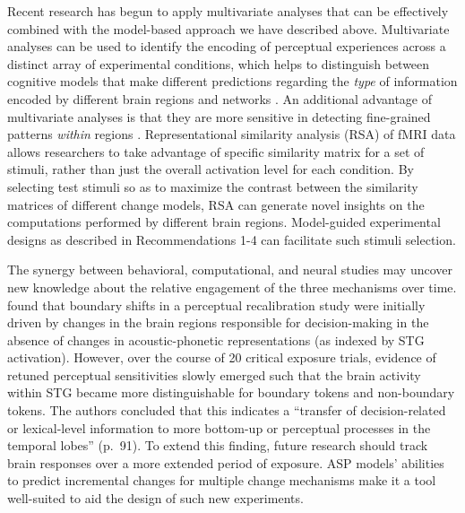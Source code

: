 \documentclass[
  11pt,
  man,floatsintext]{apa6}
\begin{document}
Recent research has begun to apply multivariate analyses that can be effectively combined with the model-based approach we have described above. Multivariate analyses can be used to identify the encoding of perceptual experiences across a distinct array of experimental conditions, which helps to distinguish between cognitive models that make different predictions regarding the \emph{type} of information encoded by different brain regions and networks \autocite[e.g.,][]{blank2016}. An additional advantage of multivariate analyses is that they are more sensitive in detecting fine-grained patterns \emph{within} regions \autocites[e.g.,][]{bonte2017,luthra2020a}. Representational similarity analysis (RSA) of fMRI data allows researchers to take advantage of specific similarity matrix for a set of stimuli, rather than just the overall activation level for each condition. By selecting test stimuli so as to maximize the contrast between the similarity matrices of different change models, RSA can generate novel insights on the computations performed by different brain regions. Model-guided experimental designs as described in Recommendations 1-4 can facilitate such stimuli selection.

The synergy between behavioral, computational, and neural studies may uncover new knowledge about the relative engagement of the three mechanisms over time. \textcite{myers-mesite2014} found that boundary shifts in a perceptual recalibration study were initially driven by changes in the brain regions responsible for decision-making in the absence of changes in acoustic-phonetic representations (as indexed by STG activation). However, over the course of 20 critical exposure trials, evidence of retuned perceptual sensitivities slowly emerged such that the brain activity within STG became more distinguishable for boundary tokens and non-boundary tokens. The authors concluded that this indicates a ``transfer of decision-related or lexical-level information to more bottom-up or perceptual processes in the temporal lobes'' (p.~91). To extend this finding, future research should track brain responses over a more extended period of exposure. ASP models' abilities to predict incremental changes for multiple change mechanisms make it a tool well-suited to aid the design of such new experiments.
\end{document}
